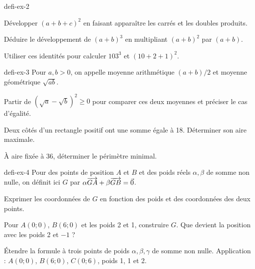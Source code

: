 \begin{blocEdition}{defi-ex-2}
\begin{questions}
\item Développer $(a+b+c)^2$ en faisant apparaître les carrés et les doubles produits.
\item Déduire le développement de $(a+b)^3$ en multipliant $(a+b)^2$ par $(a+b)$.
\item Utiliser ces identités pour calculer $103^3$ et $(10+2+1)^2$.
\end{questions}
\end{blocEdition}
\begin{blocEdition}{defi-ex-3}
Pour $a,b>0$, on appelle moyenne arithmétique $(a+b)/2$ et moyenne géométrique $\sqrt{ab}$.\begin{questions}
\item Partir de $(\sqrt a-\sqrt b)^2\ge0$ pour comparer ces deux moyennes et préciser le cas d’égalité.
\item Deux côtés d’un rectangle positif ont une somme égale à 18. Déterminer son aire maximale.
\item À aire fixée à 36, déterminer le périmètre minimal.
\end{questions}\label{fig-defi-ex-3}

\end{blocEdition}
\begin{blocEdition}{defi-ex-4}
Pour des points de position $A$ et $B$ et des poids réels $\alpha,\beta$ de somme non nulle, on définit ici $G$ par $\alpha\overrightarrow{GA}+\beta\overrightarrow{GB}=\vec0$.\begin{questions}
\item Exprimer les coordonnées de $G$ en fonction des poids et des coordonnées des deux points.
\item Pour $A(0;0)$, $B(6;0)$ et les poids 2 et 1, construire $G$. Que devient la position avec les poids 2 et $-1$ ?
\item Étendre la formule à trois points de poids $\alpha,\beta,\gamma$ de somme non nulle. Application : $A(0;0)$, $B(6;0)$, $C(0;6)$, poids 1, 1 et 2.
\end{questions}\label{fig-defi-ex-4}

\end{blocEdition}
